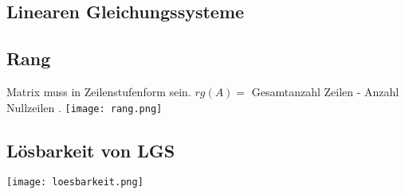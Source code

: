 \begin{multicols*}{3}
\section{Linearen Gleichungssysteme}
\subsection{Rang}
{Matrix muss in Zeilenstufenform sein.}
{$rg(A) = $ Gesamtanzahl Zeilen - Anzahl Nullzeilen .}
 \texttt{[image: rang.png]} 
 
\subsection{Lösbarkeit von LGS}

 \texttt{[image: loesbarkeit.png]}


\WhiteSpace

\mbox{}
	
\end{multicols*} 


